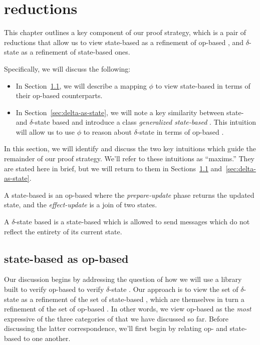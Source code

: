 \chapter{\CRDT reductions}
\label{chap:crdt-reductions}

This chapter outlines a key component of our proof strategy, which is a pair of
reductions that allow us to view state-based \CRDTs as a refinement of op-based
\CRDTs, and $\delta$-state \CRDTs as a refinement of state-based ones.

Specifically, we will discuss the following:
\begin{itemize}
  \item In Section~\ref{sec:state-as-op}, we will describe a mapping $\phi$ to
    view state-based \CRDTs in terms of their op-based counterparts.
  \item In Section~\ref{sec:delta-as-state}, we will note a key similarity
    between state- and $\delta$-state based \CRDTs and introduce a class
    \emph{generalized state-based \CRDTs}. This intuition will allow us to use
    $\phi$ to reason about $\delta$-state \CRDTs in terms of op-based \CRDTs.
\end{itemize}

In this section, we will identify and discuss the two key intuitions which guide
the remainder of our proof strategy. We'll refer to these intuitions as
``maxims.'' They are stated here in brief, but we will return to them in
Sections~\ref{sec:state-as-op} and~\ref{sec:delta-as-state}.

\begin{maxim}
  \label{maxim:state-as-op}
  A state-based \CRDT is an op-based \CRDT where the \emph{prepare-update} phase
  returns the updated state, and the \emph{effect-update} is a join of two
  states.
\end{maxim}

\begin{maxim}
  \label{maxim:delta-as-state}
  A $\delta$-state based \CRDT is a state-based \CRDT which is allowed to send
  messages which do not reflect the entirety of its current state.
\end{maxim}

\section{state-based \CRDTs as op-based}
\label{sec:state-as-op}
Our discussion begins by addressing the question of how we will use a library
built to verify op-based \CRDTs to verify $\delta$-state \CRDTs. Our approach is
to view the set of $\delta$-state \CRDTs as a refinement of the set of
state-based \CRDTs, which are themselves in turn a refinement of the set of
op-based \CRDTs. In other words, we view op-based \CRDTs as the \emph{most}
expressive of the three categories of \CRDTs that we have discussed so far.
Before discussing the latter correspondence, we'll first begin by relating op-
and state-based \CRDTs to one another.

